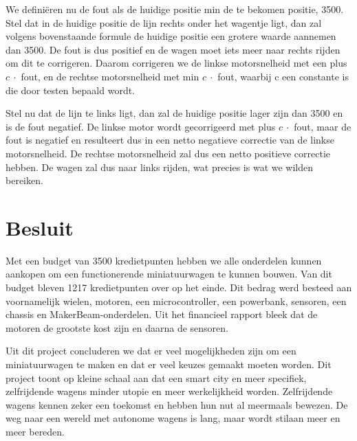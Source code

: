 \documentclass[a4paper,kulak]{kulakarticle}
\begin{document}
We definiëren nu de fout als de huidige positie min de te bekomen positie, 3500. Stel dat in de huidige positie de lijn rechts onder het wagentje ligt, dan zal volgens bovenstaande formule de huidige positie een grotere waarde aannemen dan 3500. De fout is dus positief en de wagen moet iets meer naar rechts rijden om dit te corrigeren. Daarom corrigeren we de linkse motorsnelheid met een plus $c \ \cdot$ fout, en de rechtse motorsnelheid met min $c \ \cdot$ fout, waarbij c een constante is die door testen bepaald wordt. 

Stel nu dat de lijn te links ligt, dan zal de huidige positie lager zijn dan 3500 en is de fout negatief. De linkse motor wordt gecorrigeerd met plus $c \  \cdot$ fout, maar de fout is negatief en resulteert dus in een netto negatieve correctie van de linkse motorsnelheid. De rechtse motorsnelheid zal dus een netto positieve correctie hebben. De wagen zal dus naar links rijden, wat precies is wat we wilden bereiken.


\section{Besluit}


Met een budget van 3500 kredietpunten hebben we alle onderdelen kunnen aankopen om een functionerende miniatuurwagen te kunnen bouwen. Van dit budget bleven 1217 kredietpunten over op het einde. Dit bedrag werd besteed aan voornamelijk wielen, motoren, een microcontroller, een powerbank, sensoren, een chassis en MakerBeam-onderdelen. Uit het financieel rapport bleek dat de motoren de grootste kost zijn en daarna de sensoren. 

Uit dit project concluderen we dat er veel mogelijkheden zijn om een miniatuurwagen te maken en dat er veel keuzes gemaakt moeten worden. Dit project toont op kleine schaal aan dat een smart city en meer specifiek, zelfrijdende wagens minder utopie en meer werkelijkheid worden. Zelfrijdende wagens kennen zeker een toekomst en hebben hun nut al meermaals bewezen. De weg naar een wereld met autonome wagens is lang, maar wordt stilaan meer en meer bereden.



\end{document}

